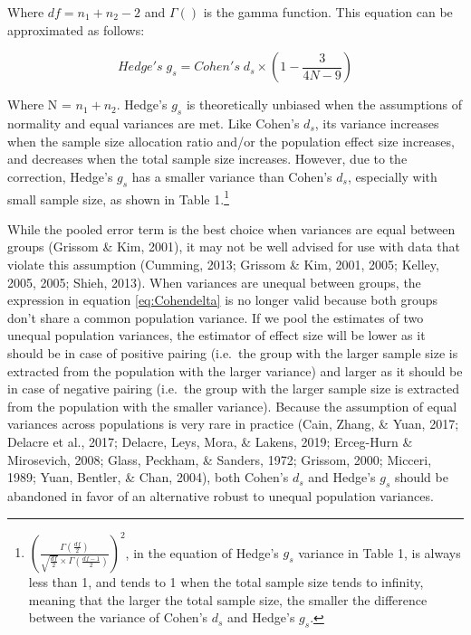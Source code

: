 \documentclass[
  man,floatsintext]{apa6}
\begin{document}
Where \(df=n_1+n_2-2\) and \(\Gamma()\) is the gamma function. This equation can be approximated as follows:

\begin{equation} 
Hedge's \; g_s = Cohen's \; d_s \times \left( 1- \frac{3}{4N -9} \right)
\label{eq:Hedgesgsapprox}
\end{equation}

Where N = \(n_1+n_2\). Hedge's \(g_s\) is theoretically unbiased when the assumptions of normality and equal variances are met. Like Cohen's \(d_s\), its variance increases when the sample size allocation ratio and/or the population effect size increases, and decreases when the total sample size increases. However, due to the correction, Hedge's \(g_s\) has a smaller variance than Cohen's \(d_s\), especially with small sample size, as shown in Table 1.\footnote{$\left(\frac{\Gamma(\frac{df}{2})}{\sqrt{\frac{df}{2}} \times \Gamma(\frac{df-1}{2})} \right)^2$, in the equation of Hedge's $g_s$ variance in Table 1, is always less than 1, and tends to 1 when the total sample size tends to infinity, meaning that the larger the total sample size, the smaller the difference between the variance of Cohen's $d_s$ and Hedge's $g_s$.}

While the pooled error term is the best choice when variances are equal between groups (Grissom \& Kim, 2001), it may not be well advised for use with data that violate this assumption (Cumming, 2013; Grissom \& Kim, 2001, 2005; Kelley, 2005, 2005; Shieh, 2013). When variances are unequal between groups, the expression in equation \ref{eq:Cohendelta} is no longer valid because both groups don't share a common population variance. If we pool the estimates of two unequal population variances, the estimator of effect size will be lower as it should be in case of positive pairing (i.e.~the group with the larger sample size is extracted from the population with the larger variance) and larger as it should be in case of negative pairing (i.e.~the group with the larger sample size is extracted from the population with the smaller variance). Because the assumption of equal variances across populations is very rare in practice (Cain, Zhang, \& Yuan, 2017; Delacre et al., 2017; Delacre, Leys, Mora, \& Lakens, 2019; Erceg-Hurn \& Mirosevich, 2008; Glass, Peckham, \& Sanders, 1972; Grissom, 2000; Micceri, 1989; Yuan, Bentler, \& Chan, 2004), both Cohen's \(d_s\) and Hedge's \(g_s\) should be abandoned in favor of an alternative robust to unequal population variances.
\end{document}
